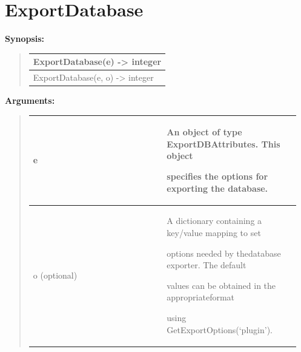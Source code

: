 \documentclass[letterpaper,10pt,english]{sphinxmanual}
\begin{document}
\section{ExportDatabase}
\label{functions:exportdatabase}
\begin{DUlineblock}{0em}
\item[] \textbf{Synopsis:}
\end{DUlineblock}
\begin{quote}

\begin{tabulary}{\linewidth}{|L|}
\hline

ExportDatabase(e) -\textgreater{} integer
\\
\hline
ExportDatabase(e, o) -\textgreater{} integer
\\
\hline\end{tabulary}

\end{quote}

\begin{DUlineblock}{0em}
\item[] 
\item[] \textbf{Arguments:}
\end{DUlineblock}
\begin{quote}

\begin{tabular}{|p{0.475\linewidth}|p{0.475\linewidth}|}
\hline

e
 & 
\begin{DUlineblock}{0em}
\item[] An object of type ExportDBAttributes. This object
\item[] specifies the options for exporting the database.
\end{DUlineblock}
\\
\hline
o (optional)
 & 
\begin{DUlineblock}{0em}
\item[] A dictionary containing a key/value mapping to set
\item[] options needed by thedatabase exporter. The default
\item[] values can be obtained in the appropriateformat
\item[] using GetExportOptions(`plugin').
\end{DUlineblock}
\\
\hline\end{tabular}

\end{quote}
\end{document}
